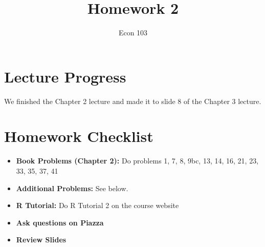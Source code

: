 \documentclass[addpoints,12pt]{exam}
\title{Homework 2}
\author{Econ 103}
\date{}
\begin{document}
\maketitle

\section*{Lecture Progress}
We finished the Chapter 2 lecture and made it to slide 8 of the Chapter 3 lecture.

\section*{Homework Checklist}
\begin{itemize}[label = $\square$]
	\item \textbf{Book Problems (Chapter 2):} Do problems 1, 7, 8, 9bc, 13, 14, 16, 21, 23, 33, 35, 37, 41
	\item \textbf{Additional Problems:} See below.
	\item \textbf{R Tutorial:} Do R Tutorial 2 on the course website
	\item \textbf{Ask questions on Piazza}
	\item \textbf{Review Slides}
\end{itemize}
\end{document}
